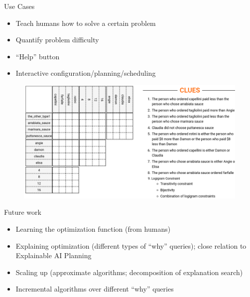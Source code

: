 \documentclass{beamer}
\begin{document}
	\begin{frame}{Use Cases}
	\begin{minipage}{0.6\textwidth}
		 \begin{itemize}
			\item Teach humans how to solve a certain problem
			\item Quantify problem difficulty
			\item ``Help'' button
			\item Interactive configuration/planning/scheduling
		\end{itemize}
		
	\end{minipage}
	\begin{minipage}{0.39\textwidth}
		\begin{figure}
			\includegraphics[width=\textwidth]{logic_puzzle.png}
		\end{figure}
	\end{minipage}

	
	
\end{frame}

	\begin{frame}{Future work}

\begin{itemize}
	\item Learning the optimization function (from humans)
	\item Explaining optimization (different types of ``why'' queries); close relation to Explainable AI Planning \cite{fox2017explainable}
	\item Scaling up (approximate algorithms; decomposition of explanation search)
	\item Incremental algorithms over different ``why'' queries
\end{itemize}	
	
	
\end{frame}
\end{document}
